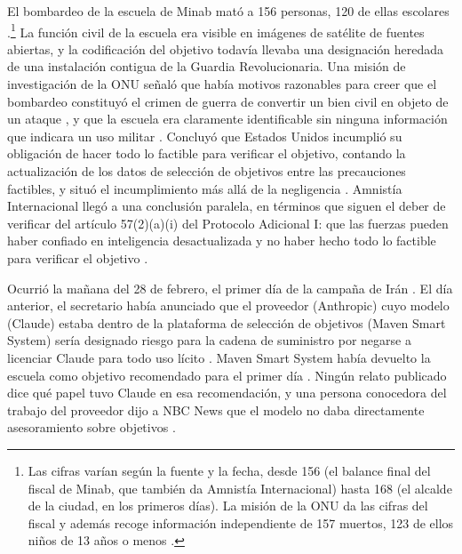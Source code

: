 El bombardeo de la escuela de Minab mató a 156 personas, 120 de ellas escolares \autocite[párr.~92]{UNFFMIran2026}.\footnote{Las cifras varían según la fuente y la fecha, desde 156 (el balance final del fiscal de Minab, que también da Amnistía Internacional) hasta 168 (el alcalde de la ciudad, en los primeros días). La misión de la ONU da las cifras del fiscal y además recoge información independiente de 157 muertos, 123 de ellos niños de 13 años o menos \autocite[párrs.~92–93]{UNFFMIran2026}.} La función civil de la escuela era visible en imágenes de satélite de fuentes abiertas, y la codificación del objetivo todavía llevaba una designación heredada de una instalación contigua de la Guardia Revolucionaria. Una misión de investigación de la ONU señaló que había motivos razonables para creer que el bombardeo constituyó el crimen de guerra de convertir un bien civil en objeto de un ataque \autocite{ohchr2026minabpress}, y que la escuela era claramente identificable sin ninguna información que indicara un uso militar \autocite[párrs.~81–86, 124–126]{UNFFMIran2026}. Concluyó que Estados Unidos incumplió su obligación de hacer todo lo factible para verificar el objetivo, contando la actualización de los datos de selección de objetivos entre las precauciones factibles, y situó el incumplimiento más allá de la negligencia \autocite[párrs.~124–125]{UNFFMIran2026}. Amnistía Internacional llegó a una conclusión paralela, en términos que siguen el deber de verificar del artículo 57(2)(a)(i) del Protocolo Adicional I: que las fuerzas pueden haber confiado en inteligencia desactualizada y no haber hecho todo lo factible para verificar el objetivo \autocite{Amnesty2026Minab}.

Ocurrió la mañana del 28 de febrero, el primer día de la campaña de Irán \autocite{Amnesty2026Minab,crs2026iranwar}. El día anterior, el secretario había anunciado que el proveedor (Anthropic) cuyo modelo (Claude) estaba dentro de la plataforma de selección de objetivos (Maven Smart System) sería designado riesgo para la cadena de suministro por negarse a licenciar Claude para todo uso lícito \autocite{npr2026openai}. Maven Smart System había devuelto la escuela como objetivo recomendado para el primer día \autocite{livingstone2026maven,gizmodo2026minab}. Ningún relato publicado dice qué papel tuvo Claude en esa recomendación, y una persona conocedora del trabajo del proveedor dijo a NBC News que el modelo no daba directamente asesoramiento sobre objetivos \autocite{nbc2026targeting}.


